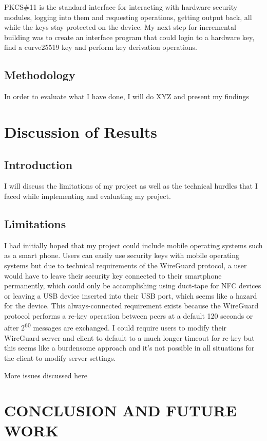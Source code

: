 \documentclass [11pt, proquest] {uwthesis}[2020/02/24]
\begin{document}
PKCS\#11 is the standard interface for interacting with hardware security modules, logging into them and requesting operations, getting output back, all while the keys stay protected on the device.
My next step for incremental building was to create an interface program that could login to a hardware key, find a curve25519 key and perform key derivation operations.



\section {Methodology}
In order to evaluate what I have done, I will do XYZ and present my findings

\chapter {Discussion of Results}
\section {Introduction}
I will discuss the limitations of my project as well as the technical hurdles that I faced while implementing and evaluating my project.

\section {Limitations}
I had initially hoped that my project could include mobile operating systems such as a smart phone. Users can easily use security keys
with mobile operating systems but due to technical requirements of the WireGuard protocol, a user would have to leave their security key connected
to their smartphone permanently, which could only be accomplishing using duct-tape for NFC devices or leaving a USB device inserted into their USB port, which 
seems like a hazard for the device. This always-connected requirement exists because the WireGuard protocol performs a re-key operation between peers at a default 120 seconds 
or after 2\textsuperscript{60} messages are exchanged. I could require users to modify their WireGuard server and client to default to a much longer 
timeout for re-key but this seems like a burdensome approach and it's not possible in all situations for the client to modify server settings.

More issues discussed here 


\chapter {CONCLUSION AND FUTURE WORK}
\end{document}

